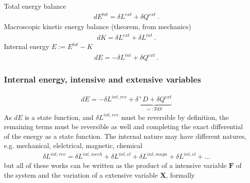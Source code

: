 \documentclass[letterpaper,10pt,english]{jupyterBook}
\begin{document}
\sphinxAtStartPar
Total energy balance
\begin{equation*}
\begin{split}d E^{tot} = \delta L^{ext} + \delta Q^{ext} \ .\end{split}
\end{equation*}
\sphinxAtStartPar
Macroscopic kinetic energy balance (theorem, from mechanics)
\begin{equation*}
\begin{split}d K = \delta L^{ext} + \delta L^{int} \ .\end{split}
\end{equation*}
\sphinxAtStartPar
Internal energy \(E := E^{tot} - K\)
\begin{equation*}
\begin{split}d E = - \delta L^{int} + \delta Q^{ext} \ .\end{split}
\end{equation*}\subsubsection*{Internal energy, intensive and extensive variables}
\begin{equation*}
\begin{split}d E = - \delta L^{int,rev} + \underbrace{\delta^+ D + \delta Q^{ext}}_{=:T dS}\end{split}
\end{equation*}
\sphinxAtStartPar
As \(dE\) is a state function, and \(\delta L^{int,rev}\) must be reversible by definition, the remaining terms must be reversible as well and completing the exact differential of the energy as a state function. The internal nature may have different natures, e.g. mechanical, elelctrical, magnetic, chemical
\begin{equation*}
\begin{split}\delta L^{int,rev} = \delta L^{int,mech} + \delta L^{int,el} + \delta L^{int,magn} + \delta L^{int,el} + \dots\end{split}
\end{equation*}
\sphinxAtStartPar
but all of these works can be written as the product of a intensive variable \(\mathbf{F}\) of the system and the variation of a extensive variable \(\mathbf{X}\), formally
\end{document}
